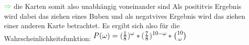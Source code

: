 \documentclass[11pt]{article}
\begin{document}
\begin{itemize}
\includegraphics[width=.9\linewidth]{201212ad-1302231774zON.png} die Karten somit also unabhängig voneinander sind
Als posititvis Ergebnis wird dabei das ziehen eines Buben und als negatvives Ergebnis wird das ziehen
einer anderen Karte betrachtet.
Es ergibt sich also für die Wahrscheinlichkeitsfunktion:
\includegraphics[width=.9\linewidth]{201301ad-17585933894AO.png}

\end{itemize}
\end{document}
